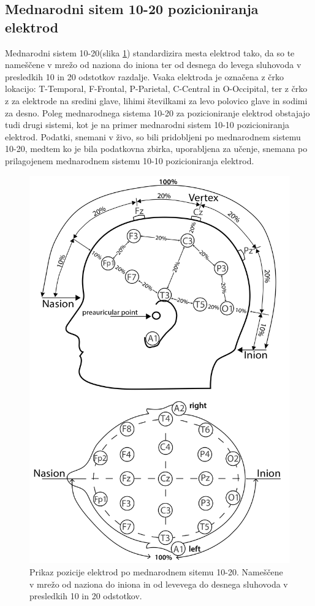 \subsection{Mednarodni sitem 10-20 pozicioniranja elektrod}
Mednarodni sistem 10-20(slika \ref{slika:mednarodni_sistem_20}) standardizira mesta elektrod tako, da so te  nameščene v mrežo od naziona do iniona ter od desnega do levega sluhovoda v presledkih 10 in 20 odstotkov razdalje. Vsaka elektroda je označena z črko lokacijo: T-Temporal, F-Frontal, P-Parietal, C-Central in O-Occipital, ter z črko z za elektrode na sredini glave, lihimi številkami za levo polovico glave in sodimi za desno. \cite{klemTentwentyElectrodeSystem1999} Poleg mednarodnega sistema 10-20 za pozicioniranje elektrod obstajajo tudi drugi sistemi, kot je na primer mednarodni sistem 10-10 pozicioniranja elektrod. Podatki, snemani v živo, so bili pridobljeni po mednarodnem sistemu 10-20, medtem ko je bila podatkovna zbirka, uporabljena za učenje, snemana po prilagojenem mednarodnem sistemu 10-10 pozicioniranja elektrod.
\begin{figure}[h]
    \begin{center}
    \includegraphics[width=0.5\linewidth]{slike/1020-diagram1.jpg}
    \end{center}
    \caption{Prikaz pozicije elektrod po mednarodnem sitemu 10-20. Nameščene v mrežo od naziona do iniona in od levevega do desnega sluhovoda v presledkih 10 in 20 odstotkov. \cite{ElectrodeArrangementAccording}}
    \label{slika:mednarodni_sistem_20}
    \end{figure}

